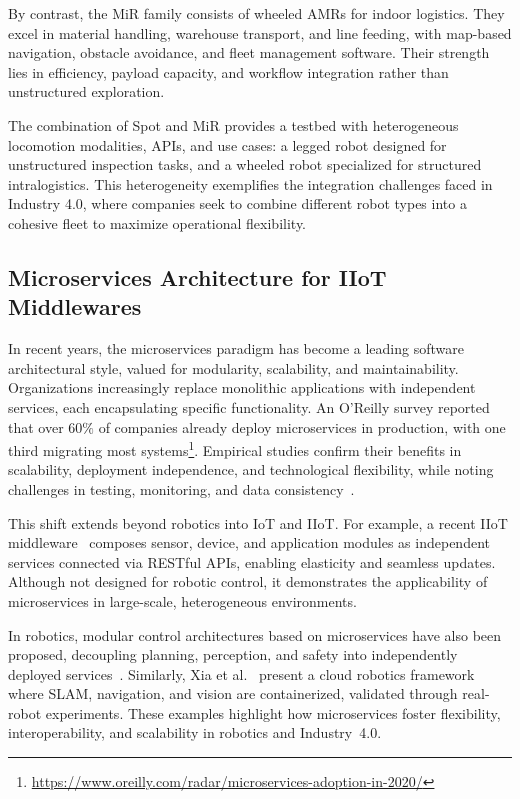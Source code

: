 \documentclass[conference]{IEEEtran}
\begin{document}
By contrast, the MiR family consists of wheeled AMRs for indoor logistics.
%
They excel in material handling, warehouse transport, and line feeding, 
 with map-based navigation, obstacle avoidance, and fleet management software.
%
Their strength lies in efficiency, payload capacity,
 and workflow integration rather than unstructured exploration.

The combination of Spot and MiR provides a testbed with heterogeneous 
 locomotion modalities, APIs, and use cases: 
  a legged robot designed for unstructured inspection tasks, 
  and a wheeled robot specialized for structured intralogistics. 
%
This heterogeneity exemplifies the integration challenges faced in Industry 4.0, 
 where companies seek to combine different robot types into a cohesive fleet 
 to maximize operational flexibility.

\subsection{Microservices Architecture for IIoT Middlewares}

In recent years,
 the microservices paradigm has become a leading software architectural style, 
 valued for modularity, scalability, and maintainability.
%
Organizations increasingly replace monolithic applications with independent services, 
 each encapsulating specific functionality.
%
An O'Reilly survey reported that over $60\%$ of companies already deploy microservices in production, 
 with one third migrating most systems\footnote{\url{https://www.oreilly.com/radar/microservices-adoption-in-2020/}}.
%
Empirical studies confirm their benefits in scalability, 
 deployment independence, and technological flexibility, while noting challenges in testing, 
 monitoring, and data consistency~\cite{nogueira2024icsm}.

This shift extends beyond robotics into IoT and IIoT.
%
For example, 
 a recent IIoT middleware~\cite{venanzi2021globecom} composes sensor, device, 
 and application modules as independent services connected via RESTful APIs, 
 enabling elasticity and seamless updates.
%
Although not designed for robotic control, 
 it demonstrates the applicability of microservices in large-scale, heterogeneous environments.

In robotics, modular control architectures based on microservices have also been proposed, 
 decoupling planning, perception, and safety into independently 
 deployed services~\cite{DBLP:journals/ras/SchrickHTK25}.
%
Similarly, Xia et al.~\cite{DBLP:journals/ras/XiaZWCL18} present a cloud robotics framework where SLAM, 
 navigation, and vision are containerized, validated through real-robot experiments.
% 
These examples highlight how microservices foster flexibility, interoperability, 
 and scalability in robotics and Industry~4.0.
\end{document}
